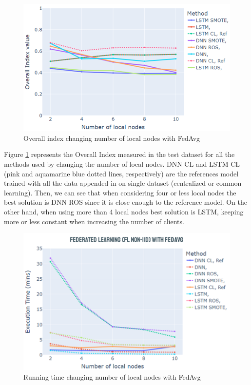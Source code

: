 \begin{figure}[H]
\centering
\includegraphics[scale=0.6]{img/change_local_nodes_metrics_fedavg.png}
\caption{Overall index changing number of local nodes with FedAvg}
\label{fig:change_local_nodes_metrics_fedavg}
\end{figure}

Figure \ref{fig:change_local_nodes_metrics_fedavg} represents the Overall Index measured in the test dataset for all the methods used by changing the number of local nodes. DNN CL and LSTM CL (pink and aquamarine blue dotted lines, respectively) are the references model trained with all the data appended in on single dataset (centralized or common learning). Then, we can see that when considering four or less local nodes the best solution is DNN ROS since it is close enough to the reference model. On the other hand, when using more than 4 local nodes best solution is LSTM, keeping more or less constant when increasing the number of clients.

\begin{figure}[H]
\centering
\includegraphics[scale=0.6]{img/change_local_nodes_time_fedavg.png}
\caption{Running time changing number of local nodes with FedAvg}
\label{fig:change_local_nodes_time_fedavg}
\end{figure}



